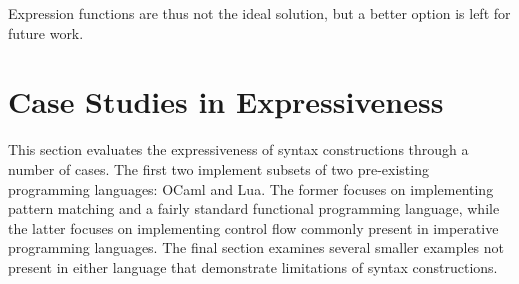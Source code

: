 \documentclass{kththesis}
\begin{document}
Expression functions are thus not the ideal solution, but a better option is left for future work.

\section{Case Studies in Expressiveness} \label{sec:case-studies}

This section evaluates the expressiveness of syntax constructions through a number of cases. The first two implement subsets of two pre-existing programming languages: OCaml and Lua. The former focuses on implementing pattern matching and a fairly standard functional programming language, while the latter focuses on implementing control flow commonly present in imperative programming languages. The final section examines several smaller examples not present in either language that demonstrate limitations of syntax constructions.



\end{document}
